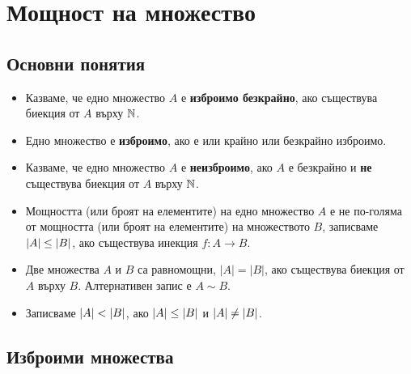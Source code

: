 \chapter{Мощност на множество}

\section{Основни понятия}

\begin{itemize}
\item 
  Казваме, че едно множество $A$ е {\bf изброимо безкрайно}, ако съществува 
  биекция от $A$ върху $\mathbb{N}$.
\item
  Едно множество е {\bf изброимо}, ако е или крайно или безкрайно изброимо.
\item
  Казваме, че едно множество $A$ е {\bf неизброимо}, ако $A$ е безкрайно и {\bf не} съществува 
  биекция от $A$ върху $\mathbb{N}$.
\item
  Мощността (или броят на елементите) на едно множество $A$ е не по-голяма от мощността (или броят на елементите) на множеството $B$, 
  записваме $\lvert{A}\rvert \leq \lvert{B}\rvert$,
  ако съществува инекция $f:A \to B$.
\item
  Две множества $A$ и $B$ са равномощни, $|A| = |B|$, ако съществува биекция от $A$ върху $B$.
  Алтернативен запис е $A \sim B$.
\item
  Записваме $\lvert{A}\rvert < \lvert{B}\rvert$, ако $\lvert{A}\rvert \leq \lvert{B}\rvert$ и $\lvert{A}\rvert \neq \lvert{B}\rvert$.
\end{itemize}

\section{Изброими множества}

